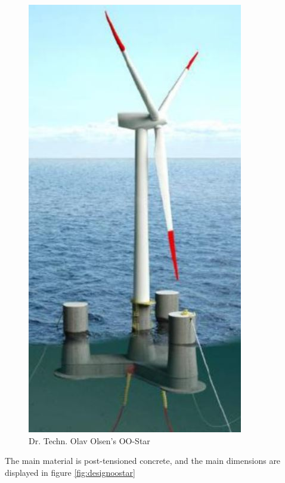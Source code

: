 \begin{figure}[H]
\centering
\includegraphics[scale=0.6]{figures/oostar}
\caption[$\; \:$Dr. Techn. Olav Olsen's OO-Star]{Dr. Techn. Olav Olsen's OO-Star \cite{Lifes50+D4.2} }
 \label{fig:oostar}
\end{figure}

\noindent The main material is post-tensioned concrete, and the main dimensions are displayed in figure \ref{fig:designoostar}

